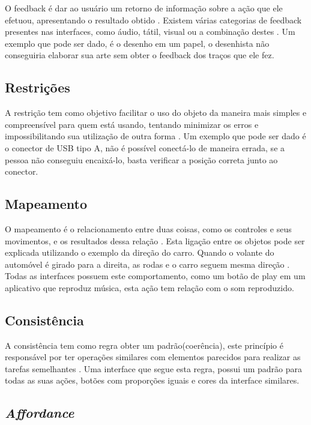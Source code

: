 \documentclass[12pt,oneside,a4paper,chapter=TITLE,section=TITLE,sumario=tradicional]{abntex2}
\begin{document}
O feedback é dar ao usuário um retorno de informação sobre a ação que ele efetuou, apresentando o resultado obtido \cite{norman2002}. Existem várias categorias de feedback presentes nas interfaces, como áudio, tátil, visual ou a combinação destes \cite{agni2015}. Um exemplo que pode ser dado, é o desenho em um papel, o desenhista não conseguiria elaborar sua arte sem obter o feedback dos traços que ele fez.

\subsection{Restrições}
\label{sec:restricoes}

A restrição tem como objetivo facilitar o uso do objeto da maneira mais simples e compreensível para quem está usando, tentando minimizar os erros e impossibilitando sua utilização de outra forma \cite{norman2002}. Um exemplo que pode ser dado é o conector de USB tipo A, não é possível conectá-lo de maneira errada, se a pessoa não conseguiu encaixá-lo, basta verificar a posição correta junto ao conector.

\subsection{Mapeamento}
\label{sec:mapeamento}

O mapeamento é o relacionamento entre duas coisas, como os controles e seus movimentos, e os resultados dessa relação \cite{norman2002}. Esta ligação entre os objetos pode ser explicada utilizando o exemplo da direção do carro. Quando o volante do automóvel é girado para a direita, as rodas e o carro seguem mesma direção \cite{norman2002}. Todas as interfaces possuem este comportamento, como um botão de play em um aplicativo que reproduz música, esta ação tem relação com o som reproduzido.

\subsection{Consistência}
\label{sec:consciencia}

A consistência tem como regra obter um padrão(coerência), este princípio é responsável por ter operações similares com elementos parecidos para realizar as tarefas semelhantes \cite{agni2015}. Uma interface que segue esta regra, possui um padrão para todas as suas ações, botões com proporções iguais e cores da interface similares.

\subsection{\textit{Affordance}}
\label{sec:affordance}
\end{document}
